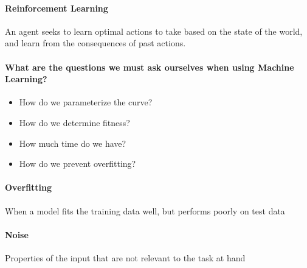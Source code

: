 \documentclass[12pt]{article}
\begin{document}
\paragraph{Reinforcement Learning} An agent seeks to learn optimal actions to take based on the state of the world, and learn from the consequences of past actions.

\paragraph{What are the questions we must ask ourselves when using Machine Learning?}

\begin{itemize}
  \item How do we parameterize the curve?
  \item How do we determine fitness?
  \item How much time do we have?
  \item How do we prevent overfitting?
\end{itemize}

\paragraph{Overfitting} When a model fits the training data well, but performs poorly on test data

\paragraph{Noise} {Properties of the input that are not relevant to the task at hand}
\end{document}
